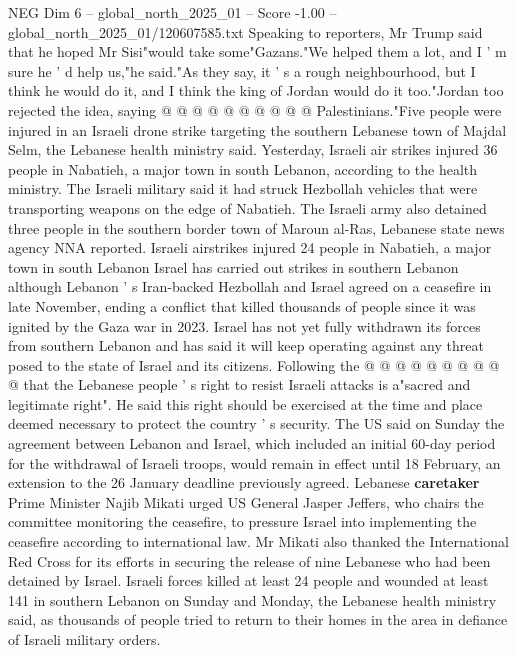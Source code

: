 \begin{textsample}{NEG Dim 6 – global\_north\_2025\_01 – Score -1.00 – global\_north\_2025\_01/120607585.txt}
Speaking to reporters, Mr Trump said that he hoped Mr Sisi"would take some"Gazans."We helped them a lot, and I ' m sure he ' d help us,"he said."As they say, it ' s a rough neighbourhood, but I think he would do it, and I think the king of Jordan would do it too."Jordan too rejected the idea, saying @ @ @ @ @ @ @ @ @ @ Palestinians."Five people were injured in an Israeli drone strike targeting the southern Lebanese town of Majdal Selm, the Lebanese health ministry said.
Yesterday, Israeli air strikes injured 36 people in Nabatieh, a major town in south Lebanon, according to the health ministry.
The Israeli military said it had struck Hezbollah vehicles that were transporting weapons on the edge of Nabatieh.
The Israeli army also detained three people in the southern border town of Maroun al-Ras, Lebanese state news agency NNA reported.
Israeli airstrikes injured 24 people in Nabatieh, a major town in south Lebanon Israel has carried out strikes in southern Lebanon although Lebanon ' s Iran-backed Hezbollah and Israel agreed on a ceasefire in late November, ending a conflict that killed thousands of people since it was ignited by the Gaza war in 2023.
Israel has not yet fully withdrawn its forces from southern Lebanon and has said it will keep operating against any threat posed to the state of Israel and its citizens.
Following the @ @ @ @ @ @ @ @ @ @ that the Lebanese people ' s right to resist Israeli attacks is a"sacred and legitimate right".
He said this right should be exercised at the time and place deemed necessary to protect the country ' s security.
The US said on Sunday the agreement between Lebanon and Israel, which included an initial 60-day period for the withdrawal of Israeli troops, would remain in effect until 18 February, an extension to the 26 January deadline previously agreed.
Lebanese \textbf{caretaker} Prime Minister Najib Mikati urged US General Jasper Jeffers, who chairs the committee monitoring the ceasefire, to pressure Israel into implementing the ceasefire according to international law.
Mr Mikati also thanked the International Red Cross for its efforts in securing the release of nine Lebanese who had been detained by Israel.
Israeli forces killed at least 24 people and wounded at least 141 in southern Lebanon on Sunday and Monday, the Lebanese health ministry said, as thousands of people tried to return to their homes in the area in defiance of Israeli military orders.

\end{textsample}
